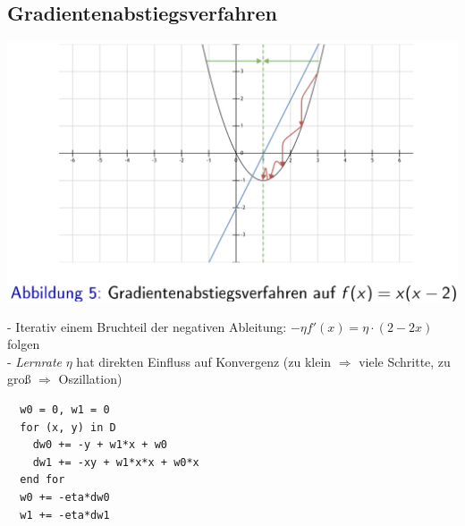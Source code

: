 \documentclass{report}
\begin{document}
\subsection{Gradientenabstiegsverfahren}

\begin{center}
  \includegraphics[scale=.25]{ml02_3}
\end{center}
- Iterativ einem Bruchteil der negativen Ableitung: $-\eta f'(x) = \eta\cdot (2 - 2x)$ folgen\\
- \textit{Lernrate} $\eta$ hat direkten Einfluss auf Konvergenz (zu klein $\Rightarrow$ viele Schritte, zu groß $\Rightarrow$ Oszillation)\\
\begin{lstlisting}
  w0 = 0, w1 = 0
  for (x, y) in D
    dw0 += -y + w1*x + w0
    dw1 += -xy + w1*x*x + w0*x
  end for
  w0 += -eta*dw0
  w1 += -eta*dw1
\end{lstlisting}
\end{document}
